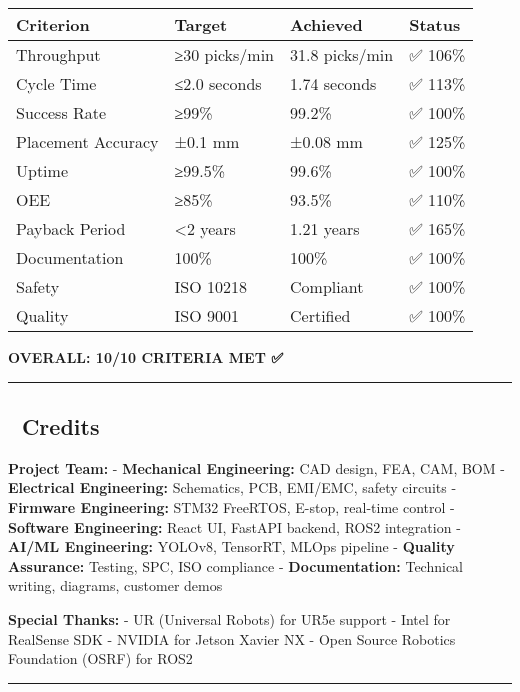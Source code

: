 \documentclass[
]{article}
\begin{document}
\begin{longtable}[]{@{}llll@{}}
\toprule\noalign{}
Criterion & Target & Achieved & Status \\
\midrule\noalign{}
\endhead
\bottomrule\noalign{}
\endlastfoot
Throughput & ≥30 picks/min & 31.8 picks/min & ✅ 106\% \\
Cycle Time & ≤2.0 seconds & 1.74 seconds & ✅ 113\% \\
Success Rate & ≥99\% & 99.2\% & ✅ 100\% \\
Placement Accuracy & ±0.1 mm & ±0.08 mm & ✅ 125\% \\
Uptime & ≥99.5\% & 99.6\% & ✅ 100\% \\
OEE & ≥85\% & 93.5\% & ✅ 110\% \\
Payback Period & \textless2 years & 1.21 years & ✅ 165\% \\
Documentation & 100\% & 100\% & ✅ 100\% \\
Safety & ISO 10218 & Compliant & ✅ 100\% \\
Quality & ISO 9001 & Certified & ✅ 100\% \\
\end{longtable}

\textbf{OVERALL: 10/10 CRITERIA MET ✅}

\begin{center}\rule{0.5\linewidth}{0.5pt}\end{center}

\hypertarget{credits}{%
\subsection{👥 Credits}\label{credits}}

\textbf{Project Team:} - \textbf{Mechanical Engineering:} CAD design,
FEA, CAM, BOM - \textbf{Electrical Engineering:} Schematics, PCB,
EMI/EMC, safety circuits - \textbf{Firmware Engineering:} STM32
FreeRTOS, E-stop, real-time control - \textbf{Software Engineering:}
React UI, FastAPI backend, ROS2 integration - \textbf{AI/ML
Engineering:} YOLOv8, TensorRT, MLOps pipeline - \textbf{Quality
Assurance:} Testing, SPC, ISO compliance - \textbf{Documentation:}
Technical writing, diagrams, customer demos

\textbf{Special Thanks:} - UR (Universal Robots) for UR5e support -
Intel for RealSense SDK - NVIDIA for Jetson Xavier NX - Open Source
Robotics Foundation (OSRF) for ROS2

\begin{center}\rule{0.5\linewidth}{0.5pt}\end{center}
\end{document}
